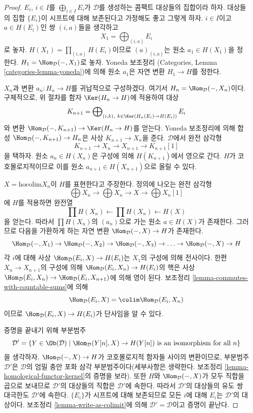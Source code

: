 \begin{proof}
$E_i$, $i \in I$를 $\bigoplus_{i \in I} E_i$가 $\mathcal{D}$를
생성하는 콤팩트 대상들의 집합이라 하자. 대상들의 집합 $\{E_i\}$이
시프트에 대해 보존된다고 가정해도 좋고 그렇게 하자.
$i \in I$이고 $a \in H(E_i)$인 쌍 $(i, a)$들을 생각하고
$$
X_1 = \bigoplus\nolimits_{(i, a)} E_i
$$
로 놓자. $H(X_1) = \prod_{(i, a)} H(E_i)$이므로
$(a)_{(i, a)}$는 원소 $a_1 \in H(X_1)$을 정한다.
$H_1 = \Hom_\mathcal{D}(- , X_1)$로 놓자. Yoneda 보조정리
(Categories, Lemma \ref{categories-lemma-yoneda})에 의해 원소 $a_1$은
자연 변환 $H_1 \to H$를 정한다.

\medskip\noindent
$X_n$과 변환 $a_n : H_n \to H$를 귀납적으로 구성하겠다. 여기서
$H_n = \Hom_\mathcal{D}(-, X_n)$이다. 구체적으로, 위 절차를 함자
$\Ker(H_n \to H)$에 적용하여 대상
$$
K_{n + 1} = \bigoplus\nolimits_{(i, k),\ k \in \Ker(H_n(E_i) \to H(E_i))} E_i
$$
와 변환 $\Hom_\mathcal{D}(-, K_{n + 1}) \to \Ker(H_n \to H)$를
얻는다. Yoneda 보조정리에 의해 합성
$\Hom_\mathcal{D}(-, K_{n + 1}) \to H_n$은 사상
$K_{n + 1} \to X_n$을 준다. $\mathcal{D}$에서 완전 삼각형
$$
K_{n + 1} \to X_n \to X_{n + 1} \to K_{n + 1}[1]
$$
을 택하자. 원소 $a_n \in H(X_n)$은 구성에 의해 $H(K_{n + 1})$에서
영으로 간다. $H$가 코호몰로지적이므로 이를 원소
$a_{n + 1} \in H(X_{n + 1})$으로 올릴 수 있다.

\medskip\noindent
$X = \text{hocolim} X_n$이 $H$를 표현한다고 주장한다. 정의에 나오는
완전 삼각형
$$
\bigoplus X_n \to
\bigoplus X_n \to X \to
\bigoplus X_n[1]
$$
에 $H$를 적용하면 완전열
$$
\prod H(X_n) \leftarrow 
\prod H(X_n) \leftarrow 
H(X)
$$
을 얻는다. 따라서 $\prod H(X_n)$의 $(a_n)$으로 가는 원소
$a \in H(X)$가 존재한다.
그러므로 다음을 가환하게 하는 자연 변환
$\Hom_\mathcal{D}(- , X) \to H$가 존재한다.
$$
\Hom_\mathcal{D}(-, X_1) \to
\Hom_\mathcal{D}(-, X_2) \to
\Hom_\mathcal{D}(-, X_3) \to \ldots \to
\Hom_\mathcal{D}(-, X) \to H
$$
각 $i$에 대해 사상 $\Hom_\mathcal{D}(E_i, X) \to H(E_i)$는
$X_1$의 구성에 의해 전사이다. 한편 $X_n \to X_{n + 1}$의 구성에
의해 $\Hom_\mathcal{D}(E_i, X_n) \to H(E_i)$의 핵은 사상
$\Hom_\mathcal{D}(E_i, X_n) \to \Hom_\mathcal{D}(E_i, X_{n + 1})$에
의해 영이 된다. 보조정리 \ref{lemma-commutes-with-countable-sums}에 의해
$$
\Hom_\mathcal{D}(E_i, X) = \colim \Hom_\mathcal{D}(E_i, X_n)
$$
이므로 $\Hom_\mathcal{D}(E_i, X) \to H(E_i)$가 단사임을 알 수 있다.

\medskip\noindent
증명을 끝내기 위해 부분범주
$$
\mathcal{D}' =
\{Y \in \Ob(\mathcal{D}) \mid \Hom_\mathcal{D}(Y[n], X) \to H(Y[n])
\text{ is an isomorphism for all }n\}
$$
을 생각하자. $\Hom_\mathcal{D}(-, X) \to H$가 코호몰로지적 함자들
사이의 변환이므로, 부분범주 $\mathcal{D}'$은 $\mathcal{D}$의 엄밀
충만 포화 삼각 부분범주이다(세부사항은 생략한다. 보조정리
\ref{lemma-homological-functor-kernel}의 증명을 보라). 또한 $H$와
$\Hom_\mathcal{D}(-, X)$가 모두 직합을 곱으로 보내므로
$\mathcal{D}'$의 대상들의 직합은 $\mathcal{D}'$에 속한다.
따라서 $\mathcal{D}'$의 대상들의 유도 쌍대극한도 $\mathcal{D}'$에
속한다. $\{E_i\}$가 시프트에 대해 보존되므로 모든 $i$에 대해
$E_i$는 $\mathcal{D}'$의 대상이다. 보조정리
\ref{lemma-write-as-colimit}에 의해 $\mathcal{D}' = \mathcal{D}$이고
증명이 끝난다.
\end{proof}

